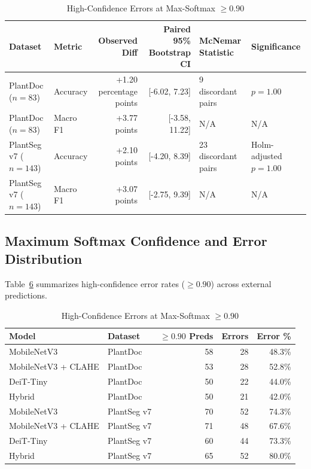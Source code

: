\documentclass[10pt,journal,compsoc]{IEEEtran}
\begin{document}
\begin{table}[t]
\begin{table}[t]
\begin{table}[t]
\caption{Paired DeiT-Tiny Minus Hybrid Model Comparisons}
\label{tab:paired}
\centering
\begin{tabular}{llrrll}
\toprule
\textbf{Dataset} & \textbf{Metric} & \textbf{Observed Diff} & \textbf{Paired 95\% Bootstrap CI} & \textbf{McNemar Statistic} & \textbf{Significance} \\
\midrule
PlantDoc ($n=83$) & Accuracy & +1.20 percentage points & [-6.02, 7.23] & 9 discordant pairs & $p = 1.00$ \\
PlantDoc ($n=83$) & Macro F1 & +3.77 points & [-3.58, 11.22] & N/A & N/A \\
PlantSeg v7 ($n=143$) & Accuracy & +2.10 points & [-4.20, 8.39] & 23 discordant pairs & Holm-adjusted $p = 1.00$ \\
PlantSeg v7 ($n=143$) & Macro F1 & +3.07 points & [-2.75, 9.39] & N/A & N/A \\
\bottomrule
\end{tabular}
\end{table}

\subsection{Maximum Softmax Confidence and Error Distribution}
Table~\ref{tab:confidence} summarizes high-confidence error rates ($\ge 0.90$) across external predictions.

\begin{table}[h]
\caption{High-Confidence Errors at Max-Softmax $\ge 0.90$}
\label{tab:confidence}
\centering
\begin{tabular}{llrrr}
\toprule
\textbf{Model} & \textbf{Dataset} & \textbf{$\ge 0.90$ Preds} & \textbf{Errors} & \textbf{Error \%} \\
\midrule
MobileNetV3 & PlantDoc & 58 & 28 & 48.3\% \\
MobileNetV3 + CLAHE & PlantDoc & 53 & 28 & 52.8\% \\
DeiT-Tiny & PlantDoc & 50 & 22 & 44.0\% \\
Hybrid & PlantDoc & 50 & 21 & 42.0\% \\
MobileNetV3 & PlantSeg v7 & 70 & 52 & 74.3\% \\
MobileNetV3 + CLAHE & PlantSeg v7 & 71 & 48 & 67.6\% \\
DeiT-Tiny & PlantSeg v7 & 60 & 44 & 73.3\% \\
Hybrid & PlantSeg v7 & 65 & 52 & 80.0\% \\
\bottomrule
\end{tabular}
\end{table}


\end{table}
\end{table}
\end{document}
